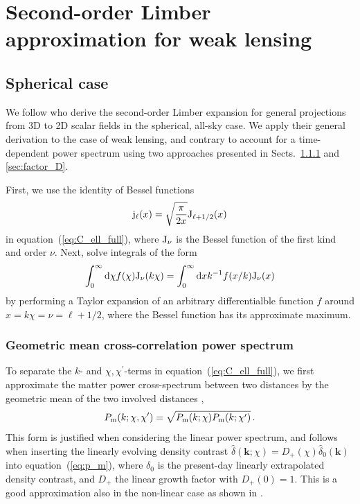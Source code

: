 \documentclass[fleqn,usenatbib]{mnras} %
\renewcommand{\vec}{\bm}
\begin{document}
\section{Second-order Limber approximation for weak lensing}
\label{sec:L2}

\subsection{Spherical case}

We follow \cite{2008PhRvD..78l3506L} who derive the second-order Limber
expansion for general projections from 3D to 2D scalar fields in the spherical,
all-sky case. We apply their general derivation to the case of weak lensing,
and contrary to \cite{2008PhRvD..78l3506L} account for a time-dependent power
spectrum using two approaches presented in Sects.~\ref{sec:geom_mean} and
\ref{sec:factor_D}.

First, we use the identity of Bessel functions
%
\begin{equation}
  {\rm j}_\ell(x) = \sqrt{\frac{\pi}{2x}} {\rm J}_{\ell + 1/2}(x)
  \label{eq:jJ}
\end{equation}
%
in equation~(\ref{eq:C_ell_full}), where ${\rm J}_\nu$ is the Bessel function of the first kind
and order $\nu$. Next, \cite{2008PhRvD..78l3506L} solve integrals of
the form
%
\begin{equation}
  \int_0^\infty {\rm d} \chi f(\chi) {\rm J}_\nu(k \chi)
  = \int_0^\infty {\rm d} x k^{-1} f(x/k) {\rm J}_\nu(x)
  \label{eq:int_dchi}
\end{equation}
%
by performing a Taylor expansion of an arbitrary differentialble function
$f$ around $x = k \chi = \nu = \ell + 1/2$, where the Bessel function has its
approximate maximum.

\subsubsection{Geometric mean cross-correlation power spectrum}
\label{sec:geom_mean}

To separate the $k$- and $\chi, \chi^\prime$-terms in
equation~(\ref{eq:C_ell_full}), we first approximate the matter power
cross-spectrum between two distances by the geometric mean of the two involved
distances \citep{2005PhRvD..72b3516C,2016arXiv161200770K},
%
\begin{equation}
 P_{\rm m}(k; \chi, \chi^\prime) = \sqrt{ P_{\rm m}(k; \chi) P_{\rm m}(k; \chi^\prime) } \, .
  \label{eq:P_geom_mean}
\end{equation}
%
This form is justified when considering the linear power spectrum, and
follows when inserting the linearly evolving density contrast $\hat \delta(\vec
k; \chi) = D_+(\chi) \hat \delta_0(\vec k)$ into equation~(\ref{eq:p_m}), where
$\delta_0$ is the present-day linearly extrapolated density contrast, and $D_+$
the linear growth factor with $D_+(0) = 1$. This is a good approximation
also in the non-linear case as shown in \cite{2016arXiv161200770K}.
\end{document}
